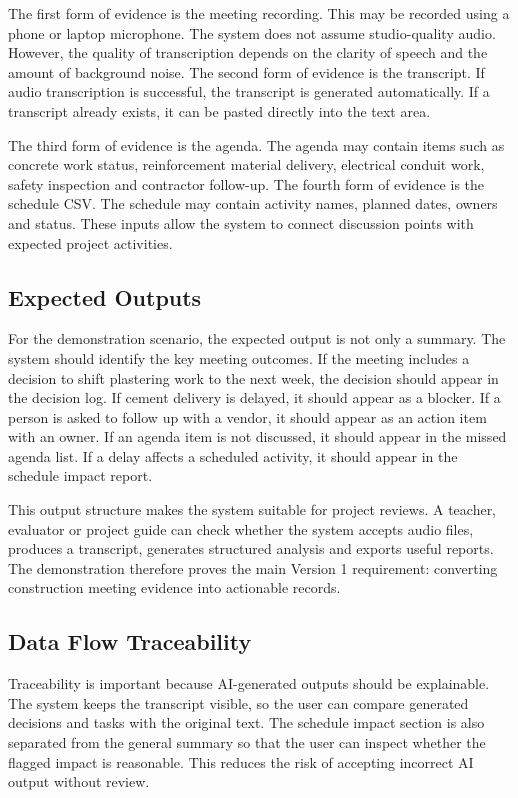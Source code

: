\documentclass[11pt,a4paper]{article}
\begin{document}
The first form of evidence is the meeting recording. This may be recorded using a phone or laptop microphone. The system does not assume studio-quality audio. However, the quality of transcription depends on the clarity of speech and the amount of background noise. The second form of evidence is the transcript. If audio transcription is successful, the transcript is generated automatically. If a transcript already exists, it can be pasted directly into the text area.

The third form of evidence is the agenda. The agenda may contain items such as concrete work status, reinforcement material delivery, electrical conduit work, safety inspection and contractor follow-up. The fourth form of evidence is the schedule CSV. The schedule may contain activity names, planned dates, owners and status. These inputs allow the system to connect discussion points with expected project activities.

\subsection{Expected Outputs}

For the demonstration scenario, the expected output is not only a summary. The system should identify the key meeting outcomes. If the meeting includes a decision to shift plastering work to the next week, the decision should appear in the decision log. If cement delivery is delayed, it should appear as a blocker. If a person is asked to follow up with a vendor, it should appear as an action item with an owner. If an agenda item is not discussed, it should appear in the missed agenda list. If a delay affects a scheduled activity, it should appear in the schedule impact report.

This output structure makes the system suitable for project reviews. A teacher, evaluator or project guide can check whether the system accepts audio files, produces a transcript, generates structured analysis and exports useful reports. The demonstration therefore proves the main Version 1 requirement: converting construction meeting evidence into actionable records.

\subsection{Data Flow Traceability}

Traceability is important because AI-generated outputs should be explainable. The system keeps the transcript visible, so the user can compare generated decisions and tasks with the original text. The schedule impact section is also separated from the general summary so that the user can inspect whether the flagged impact is reasonable. This reduces the risk of accepting incorrect AI output without review.
\end{document}
